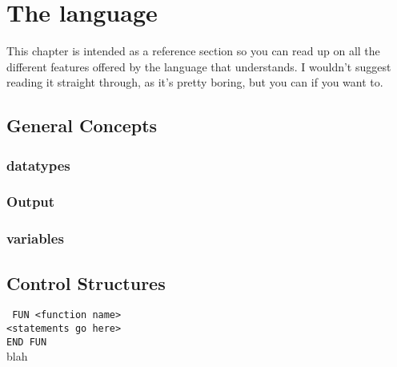 
\chapter{The language}
\label{language}

\newcommand{\breakline}{\vspace{3mm}\centerline{\rule{12cm}{1pt}}\vspace{3mm}}
\newcommand{\langExample}[2]{Example: & \texttt{#1}\\Stack Result: & \texttt{#2}}
\newcommand{\rollExample}[3]{<list:#1 values:#2 $\le$ n $\le$ #3>}
\newcommand{\listExample}[2]{<list:#1 values:(#2)>}
\newcommand{\numExample}[2]{<number:#1 $\le$ n $\le$ #2>}
\newcommand{\constraint}[1]{\textbf{Constraint:} \texttt{#1}}
\newcommand{\bl}{\\\\}
\newcommand{\ostack}{<old stack> }

This chapter is intended as a reference section so you can read up on all the
different features offered by the language that \progLogo understands. I
wouldn't suggest reading it straight through, as it's pretty boring, but you
can if you want to.

\section{General Concepts}
\label{languageConcepts}

\subsection{datatypes}
\label{datatypes}

\subsection{Output}
\label{output}

\subsection{variables}
\label{variables}

\section{Control Structures}
\label{controlStructures}

\noindent\texttt{
FUN <function name>\\
<statements go here>\\
END FUN\\
}\indent
blah

